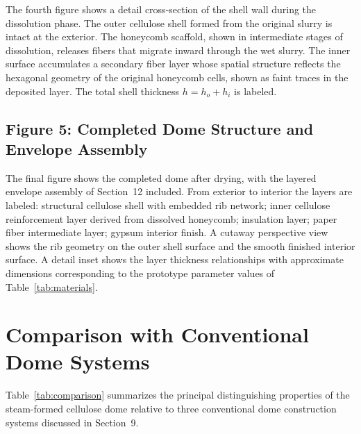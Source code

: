 \documentclass[12pt,a4paper]{article}
\begin{document}
The fourth figure shows a detail cross-section of the shell wall during
the dissolution phase. The outer cellulose shell formed from the
original slurry is intact at the exterior. The honeycomb scaffold,
shown in intermediate stages of dissolution, releases fibers that
migrate inward through the wet slurry. The inner surface accumulates a
secondary fiber layer whose spatial structure reflects the hexagonal
geometry of the original honeycomb cells, shown as faint traces in the
deposited layer. The total shell thickness $h = h_o + h_i$ is labeled.

\subsection{Figure 5: Completed Dome Structure and Envelope Assembly}

The final figure shows the completed dome after drying, with the layered
envelope assembly of Section~12 included. From exterior to interior the
layers are labeled: structural cellulose shell with embedded rib
network; inner cellulose reinforcement layer derived from dissolved
honeycomb; insulation layer; paper fiber intermediate layer; gypsum
interior finish. A cutaway perspective view shows the rib geometry on
the outer shell surface and the smooth finished interior surface. A
detail inset shows the layer thickness relationships with approximate
dimensions corresponding to the prototype parameter values of
Table~\ref{tab:materials}.

\section{Comparison with Conventional Dome Systems}

Table~\ref{tab:comparison} summarizes the principal distinguishing
properties of the steam-formed cellulose dome relative to three
conventional dome construction systems discussed in Section~9.
\end{document}
